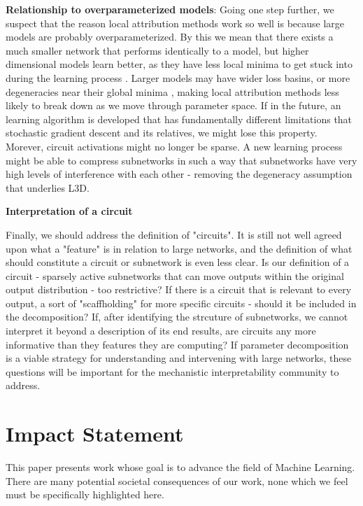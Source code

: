\documentclass{article}
\theoremstyle{plain}
\theoremstyle{definition}
\theoremstyle{remark}
\begin{document}
\textbf{Relationship to overparameterized models}: Going one step further, we suspect that the reason local attribution methods work so well is because large models are probably overparameterized. By this we mean that there exists a much smaller network that performs identically to a model, but higher dimensional models learn better, as they have less local minima to get stuck into during the learning process \cite{kawaguchi2016deep,choromanska2015loss,dauphin2014identifying,soudry2017exponentially}. Larger models may have wider loss basins, or more degeneracies near their global minima \cite{keskar2016large,sagun2017empirical}, making local attribution methods less likely to break down as we move through parameter space. If in the future, an learning algorithm is developed that has fundamentally different limitations that stochastic gradient descent and its relatives, we might lose this property. Morever, circuit activations might no longer be sparse. A new learning process might be able to compress subnetworks in such a way that subnetworks have very high levels of interference with each other - removing the degeneracy assumption that underlies L3D. 

\textbf{Interpretation of a circuit}

Finally, we should address the definition of "circuits". It is still not well agreed upon what a "feature" is in relation to large networks, and the definition of what should constitute a circuit or subnetwork is even less clear. Is our definition of a circuit - sparsely active subnetworks that can move outputs within the original output distribution - too restrictive? If there is a circuit that is relevant to every output, a sort of "scaffholding" for more specific circuits - should it be included in the decomposition? If, after identifying the strcuture of subnetworks, we cannot interpret it beyond a description of its end results, are circuits any more informative than they features they are computing? If parameter decomposition is a viable strategy for understanding and intervening with large networks, these questions will be important for the mechanistic interpretability community to address.

\clearpage

\section{Impact Statement}

This paper presents work whose goal is to advance the field of Machine Learning. There are many potential societal consequences of our work, none which we feel must be specifically highlighted here.
\end{document}
